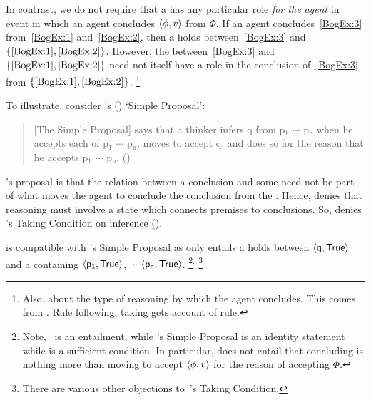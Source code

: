 \begin{note}
  In contrast, we do not require that a \ros{} has any particular role \emph{for the agent} in event in which an agent concludes \(\langle\phi, v\rangle\) from \(\Phi\).
  If an agent concludes~\ref{BogEx:3} from~\ref{BogEx:1} and~\ref{BogEx:2}, then a \ros{} holds between~\ref{BogEx:3} and \(\{\ref{BogEx:1}, \ref{BogEx:2}\}\).
  However, the \ros{} between~\ref{BogEx:3} and \(\{\ref{BogEx:1}, \ref{BogEx:2}\}\) need not itself have a role in the \agents{} conclusion of~\ref{BogEx:3} from \(\{\ref{BogEx:1}, \ref{BogEx:2}\}\).%
  \footnote{
    Also, about the type of reasoning by which the agent concludes.
    This comes from \textcite{Boghossian:2008vf,Boghossian:2012vb}.
    Rule following, taking gets account of rule.
  }

  \label{wrightSimp}%
  To illustrate, consider \citeauthor{Wright:2014tt}'s (\citeyear{Wright:2014tt}) `Simple Proposal':
  \begin{quote}
    [The Simple Proposal] says that a thinker infers q from p\(_{1}\) \(\cdots\) p\(_{\text{n}}\) when he accepts each of p\(_{1}\) \(\cdots\) p\(_{\text{n}}\), moves to accept q, and does so for the reason that he accepts p\(_{1}\) \(\cdots\) p\(_{\text{n}}\).%
    \mbox{}\hfill\mbox{(\citeyear[33]{Wright:2014tt})}
  \end{quote}
  \citeauthor{Wright:2014tt}'s proposal is that the relation between a conclusion and some \pool{} need not be part of what moves the agent to conclude the conclusion from the \pool{}.
  Hence, \citeauthor{Wright:2014tt} denies that reasoning must involve a state which connects premises to conclusions.
  So, \citeauthor{Wright:2014tt} denies \citeauthor{Boghossian:2008vf}'s Taking Condition on inference  (\citeyear[Cf.][33-34]{Wright:2014tt}).

  \supportI{} is compatible with \citeauthor{Wright:2014tt}'s Simple Proposal as \supportI{} only entails a \ros{} holds between \(\pv{\propM{q}}{\valI{True}}\) and a \pool{} containing \(\pv{\propM{p_{1}}}{\valI{True}}\), \(\cdots\) \(\pv{\propM{p_{n}}}{\valI{True}}\).%
  \footnote{
    Note,~\supportI{} is an entailment, while \citeauthor{Wright:2014tt}'s Simple Proposal is an identity statement while \supportI{} is a sufficient condition.
    In particular, \supportI{} does not entail that concluding is nothing more than moving to accept \(\langle\phi, v\rangle\) for the reason of accepting \(\Phi\).
  }\(^{,}\)%
  \footnote{
    There are various other objections to~\citeauthor{Boghossian:2014aa}'s Taking Condition.

}
\end{note}
